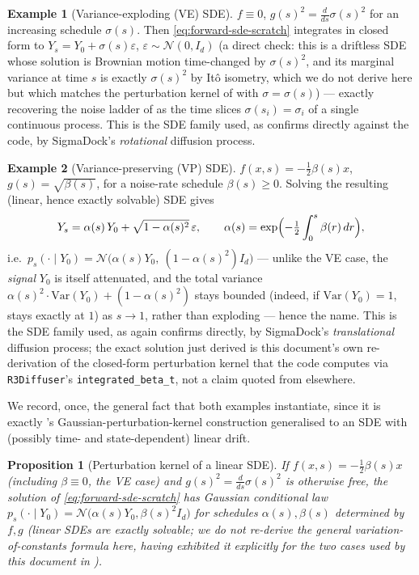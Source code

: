 \documentclass[11pt,a4paper]{report}
\newtheorem{proposition}[proposition]{Proposition}
\theoremstyle{definition}
\newtheorem{example}[example]{Example}
\theoremstyle{remark}
\newcommand{\pyfunc}[1]{\texttt{#1}}
\begin{document}
\begin{example}[Variance-exploding (VE) SDE]
\label{ex:ve-sde}
$f\equiv0$, $g(s)^2 = \tfrac{d}{ds}\sigma(s)^2$ for an increasing schedule
$\sigma(s)$. Then \eqref{eq:forward-sde-scratch} integrates in closed form
to $Y_s = Y_0 + \sigma(s)\varepsilon$, $\varepsilon\sim\mathcal N(0,I_d)$
(a direct check: this is a driftless SDE whose solution is Brownian motion
time-changed by $\sigma(s)^2$, and its marginal variance at time $s$ is
exactly $\sigma(s)^2$ by It\^o isometry, which we do not derive here but
which matches the perturbation kernel of  with
$\sigma=\sigma(s)$) --- exactly recovering the noise ladder of
 as the time slices $\sigma(s_i)=\sigma_i$
of a single continuous process. This is the SDE family used, as
 confirms directly against the code, by SigmaDock's
\emph{rotational} diffusion process.
\end{example}

\begin{example}[Variance-preserving (VP) SDE]
\label{ex:vp-sde}
$f(x,s)=-\tfrac12\beta(s)x$, $g(s)=\sqrt{\beta(s)}$, for a noise-rate
schedule $\beta(s)\ge0$. Solving the resulting (linear, hence exactly
solvable) SDE gives
\[
Y_s = \alpha(s)\,Y_0 + \sqrt{1-\alpha(s)^2}\,\varepsilon,
\qquad
\alpha(s) = \exp\Bigl(-\tfrac12\int_0^s\beta(r)\,dr\Bigr),
\]
i.e.\ $p_s(\cdot\mid Y_0) = \mathcal N\bigl(\alpha(s)Y_0,\ (1-\alpha(s)^2)I_d\bigr)$
--- unlike the VE case, the \emph{signal} $Y_0$ is itself attenuated, and
the total variance $\alpha(s)^2\cdot\mathrm{Var}(Y_0) + (1-\alpha(s)^2)$
stays bounded (indeed, if $\mathrm{Var}(Y_0)=1$, stays exactly at $1$) as
$s\to1$, rather than exploding --- hence the name. This is the SDE family
used, as  again confirms directly, by SigmaDock's
\emph{translational} diffusion process; the exact solution just derived is
this document's own re-derivation of the closed-form perturbation kernel
that the code computes via \pyfunc{R3Diffuser}'s
\pyfunc{integrated\_beta\_t}, not a claim quoted from elsewhere.
\end{example}

We record, once, the general fact that both examples instantiate, since it
is exactly 's Gaussian-perturbation-kernel
construction generalised to an SDE with (possibly time- and
state-dependent) linear drift.

\begin{proposition}[Perturbation kernel of a linear SDE]
\label{prop:linear-sde-kernel}
If $f(x,s)=-\tfrac12\beta(s)x$ (including $\beta\equiv0$, the VE case) and
$g(s)^2=\tfrac{d}{ds}\sigma(s)^2$ is otherwise free, the solution of
\eqref{eq:forward-sde-scratch} has Gaussian conditional law
$p_s(\cdot\mid Y_0)=\mathcal N\bigl(\alpha(s)Y_0,\beta(s)^2 I_d\bigr)$
for schedules $\alpha(s),\beta(s)$ determined by $f,g$ (linear SDEs are
exactly solvable; we do not re-derive the general variation-of-constants
formula here, having exhibited it explicitly for the two cases used by this
document in ).
\end{proposition}
\end{document}
